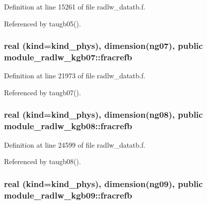 Definition at line 15261 of file radlw\+\_\+datatb.\+f.



Referenced by taugb05().

\subsubsection[{\texorpdfstring{fracrefb}{fracrefb}}]{\setlength{\rightskip}{0pt plus 5cm}real (kind=kind\+\_\+phys), dimension(ng07), public module\+\_\+radlw\+\_\+kgb07\+::fracrefb}\hypertarget{group__module__radlw__main_gaa16eb60406e5a298e380b55af528791a}{}\label{group__module__radlw__main_gaa16eb60406e5a298e380b55af528791a}


Definition at line 21973 of file radlw\+\_\+datatb.\+f.



Referenced by taugb07().

\subsubsection[{\texorpdfstring{fracrefb}{fracrefb}}]{\setlength{\rightskip}{0pt plus 5cm}real (kind=kind\+\_\+phys), dimension(ng08), public module\+\_\+radlw\+\_\+kgb08\+::fracrefb}\hypertarget{group__module__radlw__main_ga0ae7e4c01034a2b95c03b041537b962e}{}\label{group__module__radlw__main_ga0ae7e4c01034a2b95c03b041537b962e}


Definition at line 24599 of file radlw\+\_\+datatb.\+f.



Referenced by taugb08().

\subsubsection[{\texorpdfstring{fracrefb}{fracrefb}}]{\setlength{\rightskip}{0pt plus 5cm}real (kind=kind\+\_\+phys), dimension(ng09), public module\+\_\+radlw\+\_\+kgb09\+::fracrefb}\hypertarget{group__module__radlw__main_ga26476f00fe13c1c81d3ae0cf8e43c90b}{}\label{group__module__radlw__main_ga26476f00fe13c1c81d3ae0cf8e43c90b}


